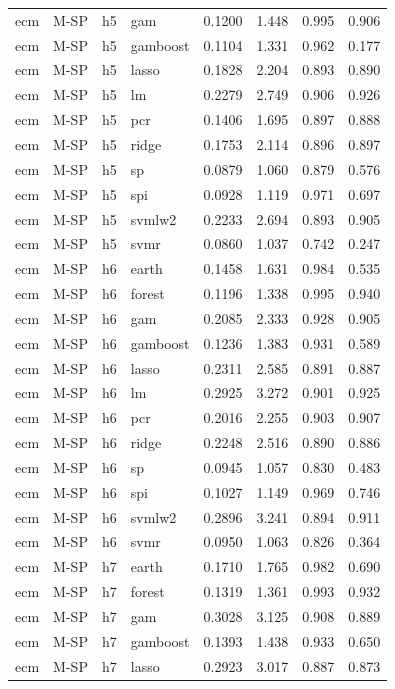 \begin{ThreePartTable}
\begin{longtable}[t]{llclcccc}
ecm & M-SP & h5 & gam & 0.1200 & 1.448 & 0.995 & 0.906\\
ecm & M-SP & h5 & gamboost & 0.1104 & 1.331 & 0.962 & 0.177\\
ecm & M-SP & h5 & lasso & 0.1828 & 2.204 & 0.893 & 0.890\\
ecm & M-SP & h5 & lm & 0.2279 & 2.749 & 0.906 & 0.926\\
ecm & M-SP & h5 & pcr & 0.1406 & 1.695 & 0.897 & 0.888\\
ecm & M-SP & h5 & ridge & 0.1753 & 2.114 & 0.896 & 0.897\\
ecm & M-SP & h5 & sp & 0.0879 & 1.060 & 0.879 & 0.576\\
ecm & M-SP & h5 & spi & 0.0928 & 1.119 & 0.971 & 0.697\\
ecm & M-SP & h5 & svmlw2 & 0.2233 & 2.694 & 0.893 & 0.905\\
ecm & M-SP & h5 & svmr & 0.0860 & 1.037 & 0.742 & 0.247\\
\addlinespace
ecm & M-SP & h6 & earth & 0.1458 & 1.631 & 0.984 & 0.535\\
ecm & M-SP & h6 & forest & 0.1196 & 1.338 & 0.995 & 0.940\\
ecm & M-SP & h6 & gam & 0.2085 & 2.333 & 0.928 & 0.905\\
ecm & M-SP & h6 & gamboost & 0.1236 & 1.383 & 0.931 & 0.589\\
ecm & M-SP & h6 & lasso & 0.2311 & 2.585 & 0.891 & 0.887\\
ecm & M-SP & h6 & lm & 0.2925 & 3.272 & 0.901 & 0.925\\
ecm & M-SP & h6 & pcr & 0.2016 & 2.255 & 0.903 & 0.907\\
ecm & M-SP & h6 & ridge & 0.2248 & 2.516 & 0.890 & 0.886\\
ecm & M-SP & h6 & sp & 0.0945 & 1.057 & 0.830 & 0.483\\
ecm & M-SP & h6 & spi & 0.1027 & 1.149 & 0.969 & 0.746\\
ecm & M-SP & h6 & svmlw2 & 0.2896 & 3.241 & 0.894 & 0.911\\
ecm & M-SP & h6 & svmr & 0.0950 & 1.063 & 0.826 & 0.364\\
\addlinespace
ecm & M-SP & h7 & earth & 0.1710 & 1.765 & 0.982 & 0.690\\
ecm & M-SP & h7 & forest & 0.1319 & 1.361 & 0.993 & 0.932\\
ecm & M-SP & h7 & gam & 0.3028 & 3.125 & 0.908 & 0.889\\
ecm & M-SP & h7 & gamboost & 0.1393 & 1.438 & 0.933 & 0.650\\
ecm & M-SP & h7 & lasso & 0.2923 & 3.017 & 0.887 & 0.873\\

\end{longtable}
\end{ThreePartTable}
